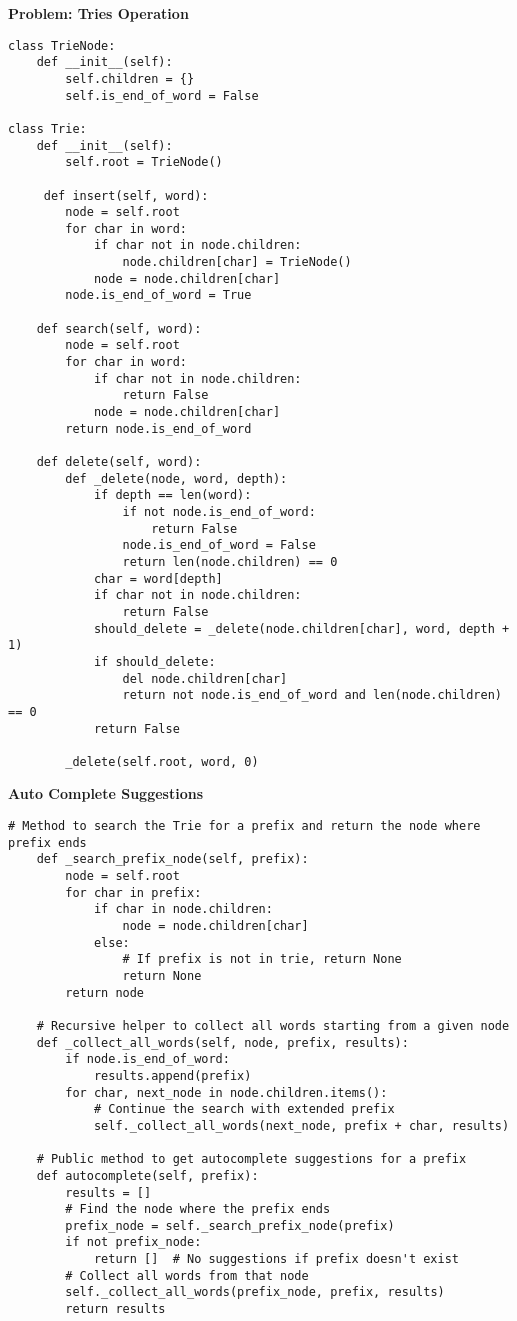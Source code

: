 \noindent\textbf{Problem: Tries Operation}
\begin{verbatim}  
class TrieNode:
    def __init__(self):
        self.children = {}
        self.is_end_of_word = False

class Trie:
    def __init__(self):
        self.root = TrieNode()

     def insert(self, word):
        node = self.root
        for char in word:
            if char not in node.children:
                node.children[char] = TrieNode()
            node = node.children[char]
        node.is_end_of_word = True

    def search(self, word):
        node = self.root
        for char in word:
            if char not in node.children:
                return False
            node = node.children[char]
        return node.is_end_of_word

    def delete(self, word):
        def _delete(node, word, depth):
            if depth == len(word):
                if not node.is_end_of_word:
                    return False
                node.is_end_of_word = False
                return len(node.children) == 0
            char = word[depth]
            if char not in node.children:
                return False
            should_delete = _delete(node.children[char], word, depth + 1)
            if should_delete:
                del node.children[char]
                return not node.is_end_of_word and len(node.children) == 0
            return False

        _delete(self.root, word, 0)
\end{verbatim}
\noindent\textbf{Auto Complete Suggestions}
\begin{verbatim}
# Method to search the Trie for a prefix and return the node where prefix ends
    def _search_prefix_node(self, prefix):
        node = self.root
        for char in prefix:
            if char in node.children:
                node = node.children[char]
            else:
                # If prefix is not in trie, return None
                return None
        return node

    # Recursive helper to collect all words starting from a given node
    def _collect_all_words(self, node, prefix, results):
        if node.is_end_of_word:
            results.append(prefix)
        for char, next_node in node.children.items():
            # Continue the search with extended prefix
            self._collect_all_words(next_node, prefix + char, results)

    # Public method to get autocomplete suggestions for a prefix
    def autocomplete(self, prefix):
        results = []
        # Find the node where the prefix ends
        prefix_node = self._search_prefix_node(prefix)
        if not prefix_node:
            return []  # No suggestions if prefix doesn't exist
        # Collect all words from that node
        self._collect_all_words(prefix_node, prefix, results)
        return results
\end{verbatim}
